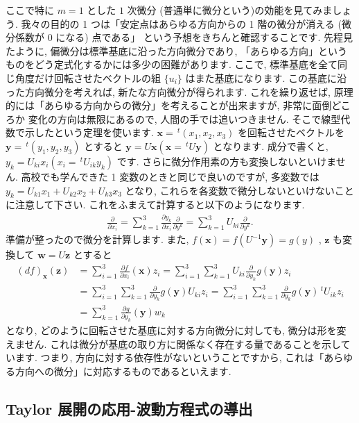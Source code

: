\documentclass[openany, a4paper, oneside]{jsbook}
\begin{document}
ここで特に $m=1$ とした $1$ 次微分 (普通単に微分という)の効能を見てみましょう.
我々の目的の 1 つは「安定点はあらゆる方向からの 1 階の微分が消える (微分係数が 0 になる) 点である」
という予想をきちんと確認することです.
先程見たように, 偏微分は標準基底に沿った方向微分であり, 「あらゆる方向」というものをどう定式化するかには多少の困難があります.
ここで, 標準基底を全て同じ角度だけ回転させたベクトルの組 $\{u_i\}$ はまた基底になります.
この基底に沿った方向微分を考えれば, 新たな方向微分が得られます.
これを繰り返せば, 原理的には「あらゆる方向からの微分」を考えることが出来ますが, 非常に面倒どころか
変化の方向は無限にあるので, 人間の手では追いつきません.
そこで線型代数で示したという定理を使います.
 $\bm{x}=\,^t (x_1,x_2,x_3)$ を回転させたベクトルを $\bm{y}=\,^t (y_1,y_2,y_3)$ とすると
 $\bm{y}=U\bm{x}(\bm{x}=\,^t U\bm{y})$ となります. 成分で書くと,  $y_k=U_{k i}x_i (x_i=\,^t U_{i k}y_k)$ です.
さらに微分作用素の方も変換しないといけません.
高校でも学んできた 1 変数のときと同じで良いのですが,
多変数では $y_k=U_{k1}x_1+U_{k2}x_2+U_{k3}x_3$ となり,
これらを各変数で微分しないといけないことに注意して下さい.
これをふまえて計算すると以下のようになります.
\begin{align}
    \frac{\partial } {\partial x_i}
    =
    \sum_{k=1}^3 \frac{\partial y_k } {\partial x_i} \frac{\partial } {\partial y^k}
    =
    \sum_{k=1}^3 U_{k i} \frac{\partial } {\partial y^k}.
\end{align}
準備が整ったので微分を計算します.
また,  $f (\bm{x})=f (U^{-1}\bm{y})=g (y)$ ,  $\bm{z}$ も変換して $\bm{w}=U\bm{z}$ とすると
\begin{align}
    (df)_{\bm{x}}(\bm{z})
    &=
    \sum_{i=1}^3 \frac{\partial f } {\partial x_i }(\bm{x}) z_i
    =
    \sum_{i=1}^3 \sum_{k=1}^{3}     U_{k i} \frac{\partial } {\partial y_k}g (\bm{y}) z_i\\
    &=
    \sum_{i=1}^3 \sum_{k=1}^{3} \frac{\partial } {\partial y_k} g (\bm{y}) U_{k i} z_i
    =
    \sum_{i=1}^3 \sum_{k=1}^{3} \frac{\partial } {\partial y_k} g (\bm{y}) \,^t U_{i k} z_i\\
    &=
    \sum_{k=1}^{3} \frac{\partial g} {\partial y_k} (\bm{y}) w_k
\end{align}
となり, どのように回転させた基底に対する方向微分に対しても, 微分は形を変えません.
これは微分が基底の取り方に関係なく存在する量であることを示しています.
つまり, 方向に対する依存性がないということですから, これは「あらゆる方向への微分」に対応するものであるといえます.
\subsection{Taylor 展開の応用-波動方程式の導出}
\end{document}
